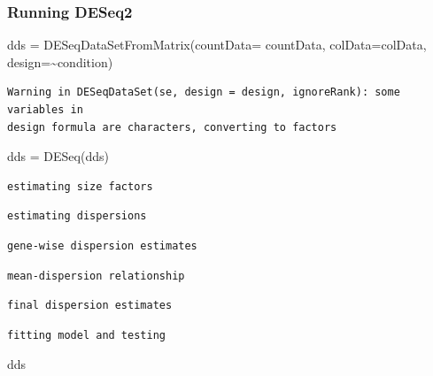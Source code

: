 \documentclass[
  letterpaper,
  DIV=11,
  numbers=noendperiod]{scrartcl}
\newenvironment{Shaded}{\begin{snugshade}}{\end{snugshade}}
\newcommand{\AttributeTok}[1]{\textcolor[rgb]{0.40,0.45,0.13}{#1}}
\newcommand{\FunctionTok}[1]{\textcolor[rgb]{0.28,0.35,0.67}{#1}}
\newcommand{\NormalTok}[1]{\textcolor[rgb]{0.00,0.23,0.31}{#1}}
\newcommand{\OtherTok}[1]{\textcolor[rgb]{0.00,0.23,0.31}{#1}}
\newcommand{\SpecialCharTok}[1]{\textcolor[rgb]{0.37,0.37,0.37}{#1}}
\begin{document}
\subsubsection{Running DESeq2}\label{running-deseq2}

\begin{Shaded}
\begin{Highlighting}[]
\NormalTok{dds }\OtherTok{=} \FunctionTok{DESeqDataSetFromMatrix}\NormalTok{(}\AttributeTok{countData=}\NormalTok{ countData,}
                             \AttributeTok{colData=}\NormalTok{colData,}
                             \AttributeTok{design=}\SpecialCharTok{\textasciitilde{}}\NormalTok{condition)}
\end{Highlighting}
\end{Shaded}

\begin{verbatim}
Warning in DESeqDataSet(se, design = design, ignoreRank): some variables in
design formula are characters, converting to factors
\end{verbatim}

\begin{Shaded}
\begin{Highlighting}[]
\NormalTok{dds }\OtherTok{=} \FunctionTok{DESeq}\NormalTok{(dds)}
\end{Highlighting}
\end{Shaded}

\begin{verbatim}
estimating size factors
\end{verbatim}

\begin{verbatim}
estimating dispersions
\end{verbatim}

\begin{verbatim}
gene-wise dispersion estimates
\end{verbatim}

\begin{verbatim}
mean-dispersion relationship
\end{verbatim}

\begin{verbatim}
final dispersion estimates
\end{verbatim}

\begin{verbatim}
fitting model and testing
\end{verbatim}

\begin{Shaded}
\begin{Highlighting}[]
\NormalTok{dds}
\end{Highlighting}
\end{Shaded}
\end{document}
